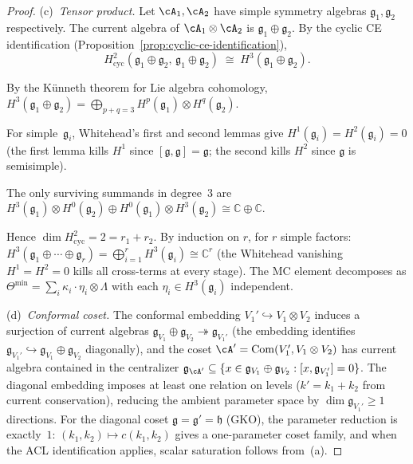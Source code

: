 \begin{proof}
\smallskip\noindent
(c)~\emph{Tensor product.}
Let $\cA_1, \cA_2$ have simple symmetry algebras
$\mathfrak{g}_1, \mathfrak{g}_2$ respectively.
The current algebra of $\cA_1 \otimes \cA_2$ is
$\mathfrak{g}_1 \oplus \mathfrak{g}_2$.  By the cyclic
CE identification
(Proposition~\ref{prop:cyclic-ce-identification}),
\[
H^2_{\mathrm{cyc}}(\mathfrak{g}_1 \oplus \mathfrak{g}_2,\,
\mathfrak{g}_1 \oplus \mathfrak{g}_2)
\;\cong\;
H^3(\mathfrak{g}_1 \oplus \mathfrak{g}_2).
\]

By the K\"unneth theorem for Lie algebra cohomology,
$H^3(\mathfrak{g}_1 \oplus \mathfrak{g}_2)
= \bigoplus_{p+q=3} H^p(\mathfrak{g}_1) \otimes
H^q(\mathfrak{g}_2)$.

For simple~$\mathfrak{g}_i$, Whitehead's first and second
lemmas give $H^1(\mathfrak{g}_i) = H^2(\mathfrak{g}_i) = 0$
(the first lemma kills $H^1$ since
$[\mathfrak{g},\mathfrak{g}] = \mathfrak{g}$;
the second kills $H^2$ since $\mathfrak{g}$ is
semisimple).

The only surviving summands in degree~$3$ are
$H^3(\mathfrak{g}_1) \otimes H^0(\mathfrak{g}_2)
\oplus H^0(\mathfrak{g}_1) \otimes H^3(\mathfrak{g}_2)
\cong \mathbb{C} \oplus \mathbb{C}$.

Hence
$\dim H^2_{\mathrm{cyc}} = 2 = r_1 + r_2$.
By induction on $r$, for $r$ simple factors:
$H^3(\mathfrak{g}_1 \oplus \cdots \oplus \mathfrak{g}_r)
= \bigoplus_{i=1}^r H^3(\mathfrak{g}_i) \cong
\mathbb{C}^r$ (the Whitehead vanishing
$H^1 = H^2 = 0$ kills all cross-terms at every stage).
The MC element decomposes as
$\Theta^{\min} = \sum_i \kappa_i \cdot \eta_i \otimes \Lambda$
with each $\eta_i \in H^3(\mathfrak{g}_i)$ independent.

\smallskip\noindent
(d)~\emph{Conformal coset.}
The conformal embedding
$V_1' \hookrightarrow V_1 \otimes V_2$ induces a surjection
of current algebras
$\mathfrak{g}_{V_1} \oplus \mathfrak{g}_{V_2}
\twoheadrightarrow \mathfrak{g}_{V_1'}$
(the embedding identifies
$\mathfrak{g}_{V_1'} \hookrightarrow
\mathfrak{g}_{V_1} \oplus \mathfrak{g}_{V_2}$ diagonally),
and the coset $\cA' = \mathrm{Com}(V_1', V_1 \otimes V_2)$
has current algebra contained in the centralizer
$\mathfrak{g}_{\cA'} \subseteq
\{x \in \mathfrak{g}_{V_1} \oplus \mathfrak{g}_{V_2}
: [x, \mathfrak{g}_{V_1'}] = 0\}$.
The diagonal embedding imposes at least one relation on
levels ($k' = k_1 + k_2$ from current conservation),
reducing the ambient parameter space by
$\dim \mathfrak{g}_{V_1'} \geq 1$ directions.
For the diagonal coset
$\mathfrak{g} = \mathfrak{g}' = \mathfrak{h}$ (GKO), the
parameter reduction is exactly~$1$:
$(k_1, k_2) \mapsto c(k_1, k_2)$ gives
a one-parameter coset family, and when the ACL identification
applies, scalar saturation follows from~(a).
\end{proof}

